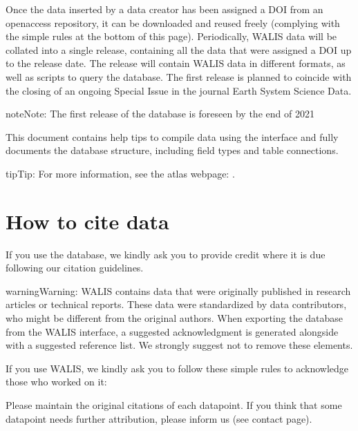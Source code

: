 \documentclass[letterpaper,10pt,english]{sphinxmanual}
\begin{document}
Once the data inserted by a data creator has been assigned a DOI from an open\sphinxhyphen{}access repository, it can be downloaded and re\sphinxhyphen{}used freely (complying with the simple rules at the bottom of this page). Periodically, WALIS data will be collated into a single release, containing all the data that were assigned a DOI up to the release date. The release will contain WALIS data in different formats, as well as scripts to query the database. The first release is planned to coincide with the closing of an ongoing Special Issue in the journal Earth System Science Data.

\begin{sphinxadmonition}{note}{Note:}
The first release of the database is foreseen by the end of 2021
\end{sphinxadmonition}

This document contains help tips to compile data using the interface and fully documents the database structure, including field types and table connections.

\begin{sphinxadmonition}{tip}{Tip:}
For more information, see the atlas webpage: .
\end{sphinxadmonition}


\section{How to cite data}
\label{\detokenize{first:how-to-cite-data}}
If you use the database, we kindly ask you to provide credit where it is due following our citation guidelines.

\begin{sphinxadmonition}{warning}{Warning:}
WALIS contains data that were originally published in research articles or technical reports. These data were standardized by data contributors, who might be different from the original authors. When exporting the database from the WALIS interface, a suggested acknowledgment is generated alongside with a suggested reference list. We strongly suggest not to remove these elements.
\end{sphinxadmonition}

If you use WALIS, we kindly ask you to follow these simple rules to acknowledge those who worked on it:

 \sphinxhyphen{} Please maintain the original citations of each datapoint. If you think that some datapoint needs further attribution, please inform us (see contact page).
\end{document}
